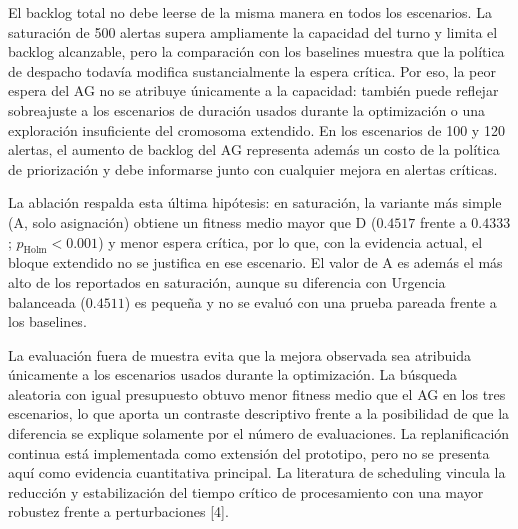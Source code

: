 \documentclass[12pt,a4paper,twocolumn]{article}
\begin{document}
El backlog total no debe leerse de la misma manera en todos los escenarios. La saturación de 500 alertas supera ampliamente la capacidad del turno y limita el backlog alcanzable, pero la comparación con los baselines muestra que la política de despacho todavía modifica sustancialmente la espera crítica. Por eso, la peor espera del AG no se atribuye únicamente a la capacidad: también puede reflejar sobreajuste a los escenarios de duración usados durante la optimización o una exploración insuficiente del cromosoma extendido. En los escenarios de 100 y 120 alertas, el aumento de backlog del AG representa además un costo de la política de priorización y debe informarse junto con cualquier mejora en alertas críticas.

La ablación respalda esta última hipótesis: en saturación, la variante más simple (A, solo asignación) obtiene un fitness medio mayor que D ($0.4517$ frente a $0.4333$; $p_\mathrm{Holm}<0.001$) y menor espera crítica, por lo que, con la evidencia actual, el bloque extendido no se justifica en ese escenario. El valor de A es además el más alto de los reportados en saturación, aunque su diferencia con Urgencia balanceada ($0.4511$) es pequeña y no se evaluó con una prueba pareada frente a los baselines.

La evaluación fuera de muestra evita que la mejora observada sea atribuida únicamente a los escenarios usados durante la optimización. La búsqueda aleatoria con igual presupuesto obtuvo menor fitness medio que el AG en los tres escenarios, lo que aporta un contraste descriptivo frente a la posibilidad de que la diferencia se explique solamente por el número de evaluaciones. La replanificación continua está implementada como extensión del prototipo, pero no se presenta aquí como evidencia cuantitativa principal. La literatura de scheduling vincula la reducción y estabilización del tiempo crítico de procesamiento con una mayor robustez frente a perturbaciones [4].

\end{document}
